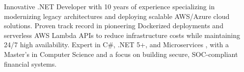 

\begin{cvparagraph}

Innovative .NET Developer with 10 years of experience specializing in modernizing legacy architectures and deploying scalable AWS/Azure cloud solutions. Proven track record in pioneering Dockerized deployments and serverless AWS Lambda APIs to reduce infrastructure costs while maintaining 24/7 high availability. Expert in C\#, .NET 5+, and Microservices , with a Master’s in Computer Science and a focus on building secure, SOC-compliant financial systems.
\end{cvparagraph}